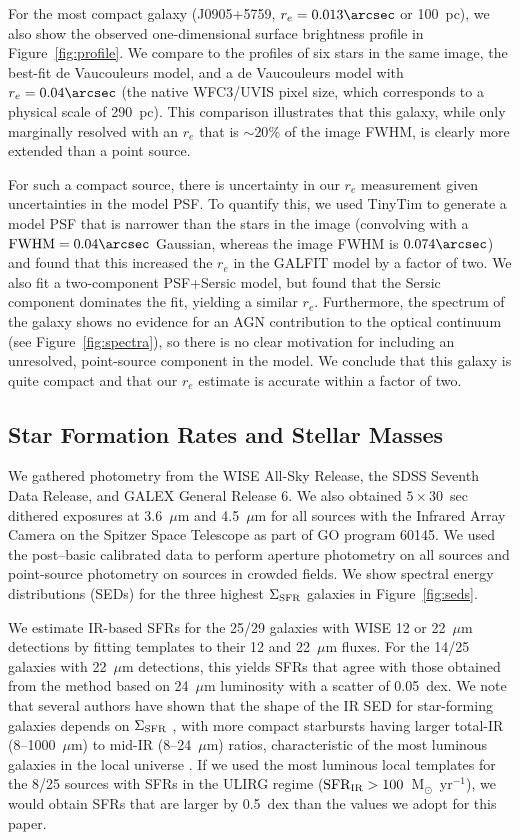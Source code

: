\documentclass[12pt,preprint]{aastex}
\newcommand{\msun}{M$_{\odot}$}
\newcommand{\sigmasfr}{\Sigma_{\textnormal{\scriptsize{SFR}}}}
\newcommand{\sfrir}{\textnormal{SFR}_{\textnormal{\scriptsize{IR}}}}
\begin{document}
For the most compact galaxy (J0905+5759, $r_e=0.013\arcsec$ or
100~pc), we also show the observed one-dimensional surface brightness
profile in Figure~\ref{fig:profile}.  We compare to the profiles of
six stars in the same image, the best-fit de Vaucouleurs model, and a
de Vaucouleurs model with $r_e=0.04\arcsec$ (the native WFC3/UVIS
pixel size, which corresponds to a physical scale of 290~pc).  This
comparison illustrates that this galaxy, while only marginally
resolved with an $r_e$ that is $\sim20\%$ of the image FWHM, is
clearly more extended than a point source.

For such a compact source, there is uncertainty in our $r_e$
measurement given uncertainties in the model PSF.  To quantify this,
we used TinyTim to generate a model PSF that is narrower than the
stars in the image (convolving with a $\textnormal{FWHM}=0.04\arcsec$
Gaussian, whereas the image FWHM is $0.074\arcsec$) and found that
this increased the $r_e$ in the GALFIT model by a factor of two.  We
also fit a two-component PSF+Sersic model, but found that the Sersic
component dominates the fit, yielding a similar $r_e$.  Furthermore,
the spectrum of the galaxy shows no evidence for an AGN contribution
to the optical continuum (see Figure~\ref{fig:spectra}), so there is
no clear motivation for including an unresolved, point-source
component in the model.  We conclude that this galaxy is quite compact
and that our $r_e$ estimate is accurate within a factor of two.



\subsection{Star Formation Rates and Stellar Masses}\label{sec:seds}

We gathered photometry from the WISE All-Sky Release, the SDSS Seventh
Data Release, and GALEX General Release 6.  We also obtained
$5\times30$~sec dithered exposures at 3.6~$\mu$m and 4.5~$\mu$m for
all sources with the Infrared Array Camera on the Spitzer Space
Telescope as part of GO program 60145.  We used the post--basic
calibrated data to perform aperture photometry on all sources and
point-source photometry on sources in crowded fields.  We show
spectral energy distributions (SEDs) for the three highest $\sigmasfr$
galaxies in Figure~\ref{fig:seds}.

We estimate IR-based SFRs for the 25/29 galaxies with WISE 12 or
22~$\mu$m detections by fitting \citet{cha01} templates to their 12
and 22~$\mu$m fluxes.  For the 14/25 galaxies with 22~$\mu$m
detections, this yields SFRs that agree with those obtained from the
\citet{ruj12} method based on 24~$\mu$m luminosity with a scatter of
0.05~dex.  We note that several authors have shown that the shape of
the IR SED for star-forming galaxies depends on $\sigmasfr$
\citep{ruj11,elb11}, with more compact starbursts having larger
total-IR (8--1000~$\mu$m) to mid-IR (8--24~$\mu$m) ratios,
characteristic of the most luminous galaxies in the local universe
\citep{rie09}.  If we used the most luminous local templates for the
8/25 sources with SFRs in the ULIRG regime
($\sfrir>100$~\msun~yr$^{-1}$), we would obtain SFRs that are larger
by 0.5~dex than the values we adopt for this paper.
\end{document}
